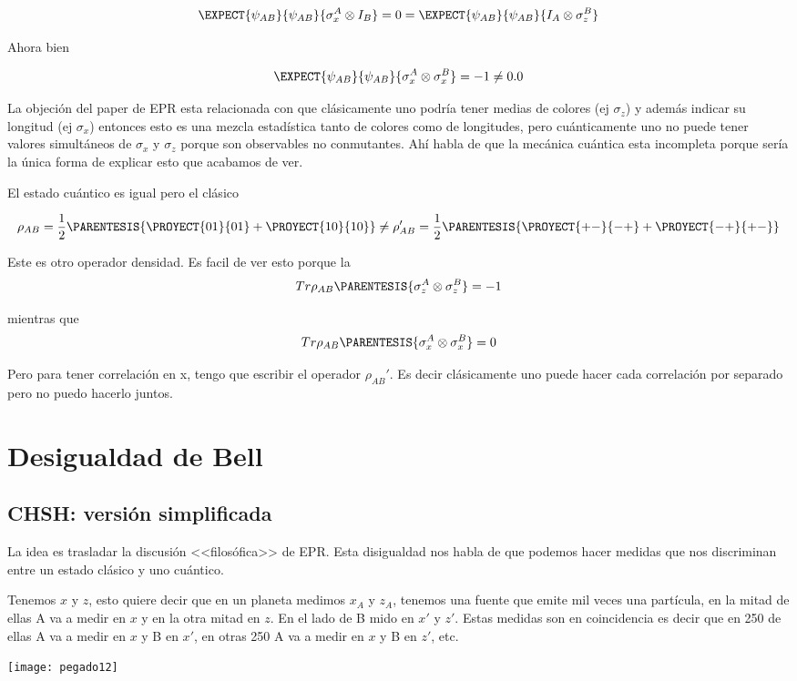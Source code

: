 \[
\EXPECT{\psi_{AB}}{\psi_{AB}}{\sigma_{x}^{A}\otimes I_{B}}=0=\EXPECT{\psi_{AB}}{\psi_{AB}}{I_{A}\otimes\sigma_{z}^{B}}
\]

Ahora bien

\[
\EXPECT{\psi_{AB}}{\psi_{AB}}{\sigma_{x}^{A}\otimes\sigma_{x}^{B}}=-1\neq0.0
\]

La objeción del paper de EPR esta relacionada con que clásicamente
uno podría tener medias de colores (ej $\sigma_{z}$) y además indicar
su longitud (ej $\sigma_{x}$) entonces esto es una mezcla estadística
tanto de colores como de longitudes, pero cuánticamente uno no puede
tener valores simultáneos de $\sigma_{x}$ y $\sigma_{z}$ porque
son observables no conmutantes. Ahí habla de que la mecánica cuántica
esta incompleta porque sería la única forma de explicar esto que acabamos
de ver. 

El estado cuántico es igual pero el clásico

\[
\rho_{AB}=\frac{1}{2}\PARENTESIS{\PROYECT{01}{01}+\PROYECT{10}{10}}\neq\rho_{AB}'=\frac{1}{2}\PARENTESIS{\PROYECT{+-}{-+}+\PROYECT{-+}{+-}}
\]

Este es otro operador densidad. Es facil de ver esto porque la 
\[
Tr\rho_{AB}\PARENTESIS{\sigma_{z}^{A}\otimes\sigma_{z}^{B}}=-1
\]

mientras que 
\[
Tr\rho_{AB}\PARENTESIS{\sigma_{x}^{A}\otimes\sigma_{x}^{B}}=0
\]

Pero para tener correlación en x, tengo que escribir el operador $\rho_{AB}'$.
Es decir clásicamente uno puede hacer cada correlación por separado
pero no puedo hacerlo juntos.

\section{Desigualdad de Bell}

\subsection{CHSH: versión simplificada}

La idea es trasladar la discusión <<filosófica>> de EPR. Esta disigualdad
nos habla de que podemos hacer medidas que nos discriminan entre un
estado clásico y uno cuántico.

Tenemos $x$ y $z$, esto quiere decir que en un planeta medimos $x_{A}$
y $z_{A}$, tenemos una fuente que emite mil veces una partícula,
en la mitad de ellas A va a medir en $x$ y en la otra mitad en $z$.
En el lado de B mido en $x'$ y $z'$. Estas medidas son en coincidencia
es decir que en 250 de ellas A va a medir en $x$ y B en $x'$, en
otras 250 A va a medir en $x$ y B en $z'$, etc.
\begin{center}
\texttt{[image: pegado12]}
\par\end{center}

